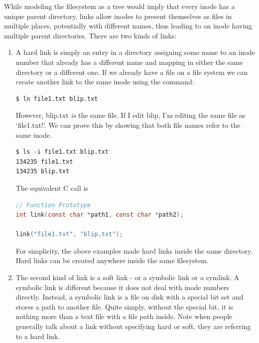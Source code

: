 While modeling the filesystem as a tree would imply that every inode has a unique parent directory, links allow inodes to present themselves as files in multiple places, potentially with different names, thus leading to an inode having multiple parent directories.
There are two kinds of links:

\begin{enumerate}
    \item {}
        A hard link is simply an entry in a directory assigning some name to an inode number that already has a different name and mapping in either the same directory or a different one.
        If we already have a file on a file system we can create another link to the same inode using the  command:

\begin{lstlisting}[language=bash]
$ ln file1.txt blip.txt
\end{lstlisting}

        However, blip.txt \emph{is} the same file.
        If I edit blip, I'm editing the same file as `file1.txt!'.
        We can prove this by showing that both file names refer to the same inode.

\begin{verbatim}
$ ls -i file1.txt blip.txt
134235 file1.txt
134235 blip.txt
\end{verbatim}

        The equivalent C call is 

\begin{lstlisting}[language=C]
// Function Prototype
int link(const char *path1, const char *path2);

link("file1.txt", "blip.txt");
\end{lstlisting}

        For simplicity, the above examples made hard links inside the same directory.
        Hard links can be created anywhere inside the same filesystem.

    \item {}
        The second kind of link is a soft link - or a symbolic link or a symlink.
        A symbolic link is different because it does not deal with inode numbers directly.
        Instead, a symbolic link is a file on disk with a special bit set and stores a path to another file.
        Quite simply, without the special bit, it is nothing more than a text file with a file path inside.
        Note when people generally talk about a link without specifying hard or soft, they are referring to a hard link.


\end{enumerate}
